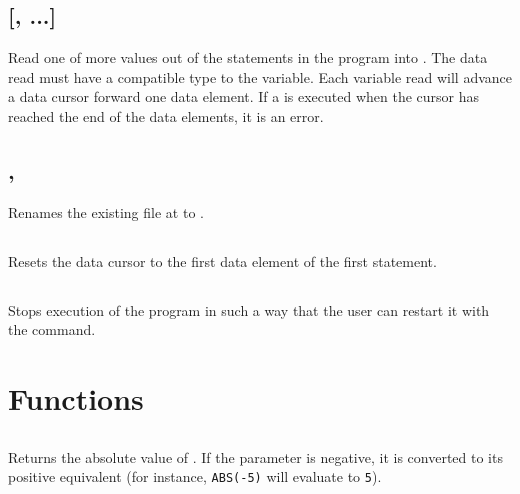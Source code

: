 \documentclass{report}
\begin{document}
    \subsection*{ [, ...]}

    Read one of more values out of the  statements in the program into
    .
    The data read must have a compatible type to the variable.
    Each variable read will advance a data cursor forward one data element.
    If a  is executed when the cursor has reached the end of the data
    elements, it is an error.

    \subsection*{ , }

    Renames the existing file at  to .

    \subsection*{}

    Resets the data cursor to the first data element of the first  statement.

    \subsection*{}

    Stops execution of the program in such a way that the user can restart it with the
     command.

    \section*{Functions}

    \subsection*{}

    Returns the absolute value of .
    If the parameter is negative, it is converted to its positive equivalent
    (for instance, \verb+ABS(-5)+ will evaluate to \verb+5+).

    \subsection*{}
\end{document}
